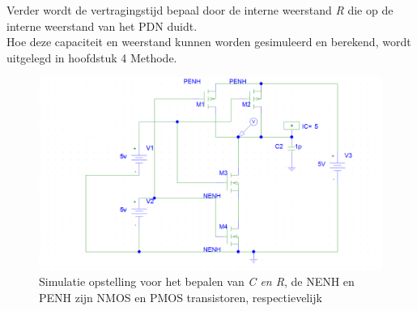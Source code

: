 \documentclass{article}
\begin{document}
Verder wordt de vertragingstijd bepaal door de interne weerstand \emph{R}  die op de interne weerstand van het PDN duidt.\\

Hoe deze capaciteit en weerstand kunnen worden gesimuleerd en berekend, wordt uitgelegd in hoofdstuk 4 Methode.

 \begin{figure} [h!]
 \begin{center}
 \includegraphics [scale = 0.4] {../figures/PDN}
 \caption{Simulatie opstelling voor het bepalen van \emph{C en R}, de NENH en PENH zijn NMOS en PMOS transistoren, respectievelijk}
 \label{res:PDN_schakeling}
 \end{center}
 \end{figure}
\end{document}
